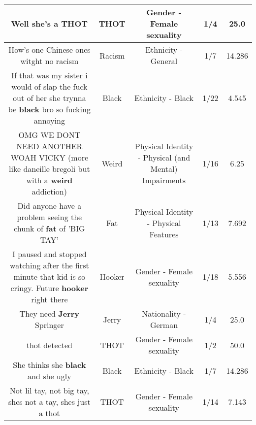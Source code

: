\documentclass[11pt]{article}
\newlength\mylength
\begin{document}
\begin{center}
\begin{longtable}{|C{.65\mylength}|C{.30\mylength}|C{.12\mylength}|C{.12\mylength}|C{.12\mylength}|}
  \small Well she's a THOT\normalsize   & THOT & Gender - Female sexuality & 1/4 & 25.0 \\  \hline
  \small How's one Chinese ones witght no racism\normalsize   & Racism & Ethnicity - General & 1/7 & 14.286 \\  \hline
  \small If that was my sister i would of slap the fuck out of her she trynna be \textbf{black} bro so fucking annoying\normalsize   & Black & Ethnicity - Black & 1/22 & 4.545 \\  \hline
  \small OMG WE DONT NEED ANOTHER WOAH VICKY (more like daneille bregoli but with a \textbf{weird} addiction)\normalsize   & Weird & Physical Identity - Physical (and Mental) Impairments & 1/16 & 6.25 \\  \hline
  \small Did anyone have a problem seeing the chunk of \textbf{fat} of 'BIG TAY'\normalsize   & Fat & Physical Identity - Physical Features & 1/13 & 7.692 \\  \hline
  \small I paused and stopped watching after the first minute that kid is so cringy. Future \textbf{hooker} right there\normalsize   & Hooker & Gender - Female sexuality & 1/18 & 5.556 \\  \hline
  \small They need \textbf{Jerry} Springer\normalsize   & Jerry & Nationality - German & 1/4 & 25.0 \\  \hline
  \small thot detected\normalsize   & THOT & Gender - Female sexuality & 1/2 & 50.0 \\  \hline
  \small She thinks she \textbf{black} and she ugly\normalsize   & Black & Ethnicity - Black & 1/7 & 14.286 \\  \hline
  \small Not lil tay, not big tay, shes not a tay, shes just a thot\normalsize   & THOT & Gender - Female sexuality & 1/14 & 7.143 \\  \hline

\end{longtable}
\end{center}
\end{document}
